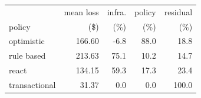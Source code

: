 \begin{tabular}{lrrrr}
\toprule
& mean loss & infra. & policy & residual \\
policy & (\$) & (\%) & (\%) & (\%) \\
\midrule
optimistic & 166.60 & -6.8 & 88.0 & 18.8 \\
rule based & 213.63 & 75.1 & 10.2 & 14.7 \\
react & 134.15 & 59.3 & 17.3 & 23.4 \\
transactional & 31.37 & 0.0 & 0.0 & 100.0 \\
\bottomrule
\end{tabular}